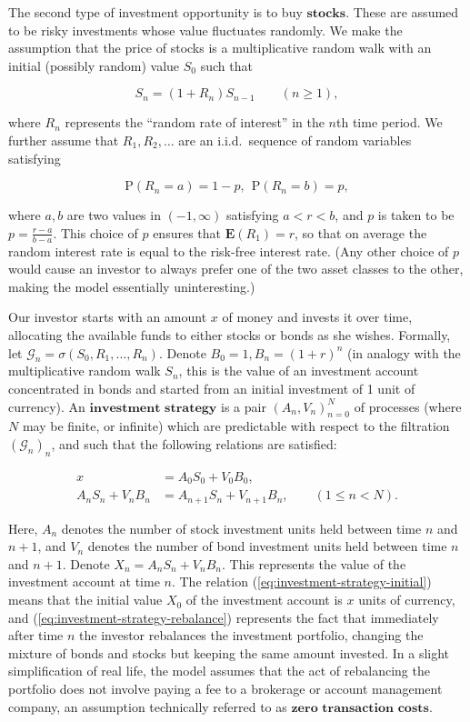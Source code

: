 The second type of investment opportunity is to buy
$\textbf{stocks}$. These are assumed to be risky
investments whose value fluctuates randomly. We make
the assumption that the price of stocks is a
multiplicative random walk with an initial (possibly
random) value $S_0$ such that

\[
S_n = (1+R_n) S_{n-1} \qquad (n\ge1),
\]

\noindent where $R_n$ represents the ``random rate of
interest'' in the $n$th time period. We further
assume that $R_1,R_2,\ldots$ are an i.i.d.\ sequence
of random variables satisfying

\[
\mathrm{P}(R_n = a) = 1-p, \ \ \mathrm{P}(R_n = b) = p,
\]

\noindent where $a,b$ are two values in $(-1,\infty)$
satisfying $a<r<b$, and $p$ is taken to be
$p=\frac{r-a}{b-a}$. This choice of $p$ ensures that
$\mathbf{E}(R_1) = r$, so that on average the random
interest rate is equal to the risk-free interest rate.
(Any other choice of $p$ would cause an investor to
always prefer one of the two asset classes to the
other, making the model essentially uninteresting.)

Our investor starts with an amount $x$ of money and
invests it over time, allocating the available funds
to either stocks or bonds as she wishes. Formally, let
$\mathcal{G}_n = \sigma(S_0,R_1,\ldots,R_n)$. Denote
$B_0=1, B_n=(1+r)^n$ (in analogy with the
multiplicative random walk $S_n$, this is the value
of an investment account concentrated in bonds and
started from an initial investment of 1 unit of
currency). An $\textbf{investment strategy}$ is a
pair $(A_n, V_n)_{n=0}^N$ of processes (where $N$ may
be finite, or infinite) which are predictable with
respect to the filtration $(\mathcal{G}_n)_n$, and
such that the following relations are satisfied:

\begin{align*}
x &= \tag{9}\label{eq:investment-strategy-initial} A_0 S_0 + V_0 B_0, \\
A_n S_n + V_n B_n &= \tag{10}\label{eq:investment-strategy-rebalance} A_{n+1} S_n + V_{n+1} B_n, \qquad (1\le n< N).
\end{align*}

\noindent Here, $A_n$ denotes the number of stock investment
units held between time $n$ and $n+1$, and $V_n$
denotes the number of bond investment units held
between time $n$ and $n+1$. Denote
$X_n = A_n S_n + V_n B_n$. This represents the value
of the investment account at time $n$. The relation
(\ref{eq:investment-strategy-initial}) means that the
initial value $X_0$ of the investment account is $x$
units of currency, and
(\ref{eq:investment-strategy-rebalance}) represents the
fact that immediately after time $n$ the investor
rebalances the investment portfolio, changing the
mixture of bonds and stocks but keeping the same
amount invested. In a slight simplification of real
life, the model assumes that the act of rebalancing
the portfolio does not involve paying a fee to a
brokerage or account management company, an assumption
technically referred to as
$\textbf{zero transaction costs}$.

